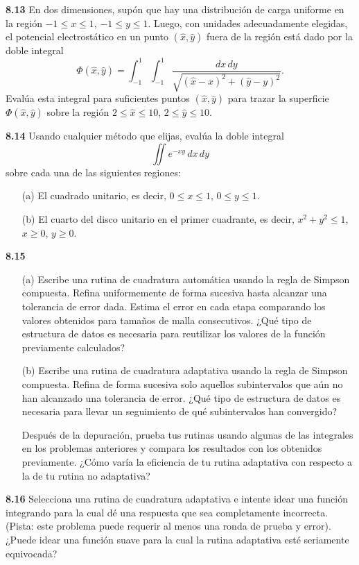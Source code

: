 \documentclass{article}
\begin{document}
\textbf{8.13} En dos dimensiones, supón que hay una distribución de carga uniforme en la región \(-1 \leq x \leq 1\), \(-1 \leq y \leq 1\). Luego, con unidades adecuadamente elegidas, el potencial electrostático en un punto \((\hat{x}, \hat{y})\) fuera de la región está dado por la doble integral
\[
\Phi(\hat{x}, \hat{y}) = \int_{-1}^1 \int_{-1}^1 \frac{dx \, dy}{\sqrt{(\hat{x} - x)^2 + (\hat{y} - y)^2}}.
\]
Evalúa esta integral para suficientes puntos \((\hat{x}, \hat{y})\) para trazar la superficie \(\Phi(\hat{x}, \hat{y})\) sobre la región \(2 \leq \hat{x} \leq 10\), \(2 \leq \hat{y} \leq 10\).

\textbf{8.14} Usando cualquier método que elijas, evalúa la doble integral
\[
\iint e^{-xy} \, dx \, dy
\]
sobre cada una de las siguientes regiones:
\begin{itemize}
    \item[(a)] El cuadrado unitario, es decir, \(0 \leq x \leq 1\), \(0 \leq y \leq 1\).
    \item[(b)] El cuarto del disco unitario en el primer cuadrante, es decir, \(x^2 + y^2 \leq 1\), \(x \geq 0\), \(y \geq 0\).
\end{itemize}

\textbf{8.15}
\begin{itemize}
    \item[(a)] Escribe una rutina de cuadratura automática usando la regla de Simpson compuesta. Refina uniformemente de forma sucesiva hasta alcanzar una tolerancia de error dada. Estima el error en cada etapa comparando los valores obtenidos para tamaños de malla consecutivos. ¿Qué tipo de estructura de datos es necesaria para reutilizar los valores de la función previamente calculados?
    
    \item[(b)] Escribe una rutina de cuadratura adaptativa usando la regla de Simpson compuesta. Refina de forma sucesiva solo aquellos subintervalos que aún no han alcanzado una tolerancia de error. ¿Qué tipo de estructura de datos es necesaria para llevar un seguimiento de qué subintervalos han convergido?
    
    Después de la depuración, prueba tus rutinas usando algunas de las integrales en los problemas anteriores y compara los resultados con los obtenidos previamente. ¿Cómo varía la eficiencia de tu rutina adaptativa con respecto a la de tu rutina no adaptativa?
\end{itemize}

\textbf{8.16} Selecciona una rutina de cuadratura adaptativa e intente idear una función integrando para la cual dé una respuesta que sea completamente incorrecta. (Pista: este problema puede requerir al menos una ronda de prueba y error). ¿Puede idear una función suave para la cual la rutina adaptativa esté seriamente equivocada?
\end{document}
